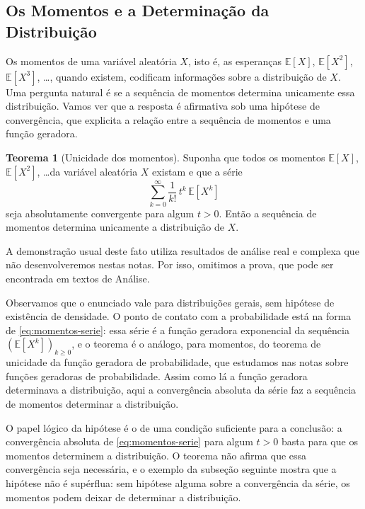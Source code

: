 \documentclass[12pt,portuguese]{article}
\theoremstyle{definition}
\newtheorem{theorem}{Teorema}
\theoremstyle{plainexercise}
\theoremstyle{starredexercise}
\theoremstyle{definition}
\begin{document}
\subsection{Os Momentos e a Determinação da Distribuição}\label{subsec:momentos-unicidade}

Os momentos de uma variável aleatória $X$, isto é, as esperanças
$\mathbb{E}[X]$, $\mathbb{E}[X^2]$, $\mathbb{E}[X^3]$, \ldots, quando existem,
codificam informações sobre a distribuição de $X$. Uma pergunta natural é se a
sequência de momentos determina unicamente essa distribuição. Vamos ver que a
resposta é afirmativa sob uma hipótese de convergência, que explicita a relação
entre a sequência de momentos e uma função geradora.

\begin{theorem}[Unicidade dos momentos]\label{thm:momentos-unicidade}
  Suponha que todos os momentos $\mathbb{E}[X]$, $\mathbb{E}[X^2]$, \ldots da
  variável aleatória $X$ existam e que a série
  \begin{equation}\label{eq:momentos-serie}
    \sum_{k = 0}^{\infty} \frac{1}{k!}\, t^k\, \mathbb{E}[X^k]
  \end{equation}
  seja absolutamente convergente para algum $t > 0$. Então a sequência de
  momentos determina unicamente a distribuição de $X$.
\end{theorem}

A demonstração usual deste fato utiliza resultados de análise real e
complexa que não desenvolveremos nestas notas. Por isso, omitimos a prova,
que pode ser encontrada em textos de Análise.

\bigskip 

Observamos que o enunciado vale para distribuições gerais, sem hipótese de
existência de densidade. O ponto de contato com a probabilidade está na forma de
\eqref{eq:momentos-serie}: essa série é a função geradora exponencial da
sequência $(\mathbb{E}[X^k])_{k \geqslant 0}$, e o teorema é o análogo, para
momentos, do teorema de unicidade da função geradora de probabilidade, que
estudamos nas notas sobre funções geradoras de probabilidade. Assim como lá a
função geradora determinava a distribuição, aqui a convergência absoluta da
série faz a sequência de momentos determinar a distribuição.

\bigskip 

O papel lógico da hipótese é o de uma condição suficiente para a conclusão: a
convergência absoluta de \eqref{eq:momentos-serie} para algum $t > 0$ basta
para que os momentos determinem a distribuição. O teorema não afirma que essa
convergência seja necessária, e o exemplo da subseção seguinte mostra que a
hipótese não é supérflua: sem hipótese alguma sobre a convergência da série,
os momentos podem deixar de determinar a distribuição.
\end{document}
